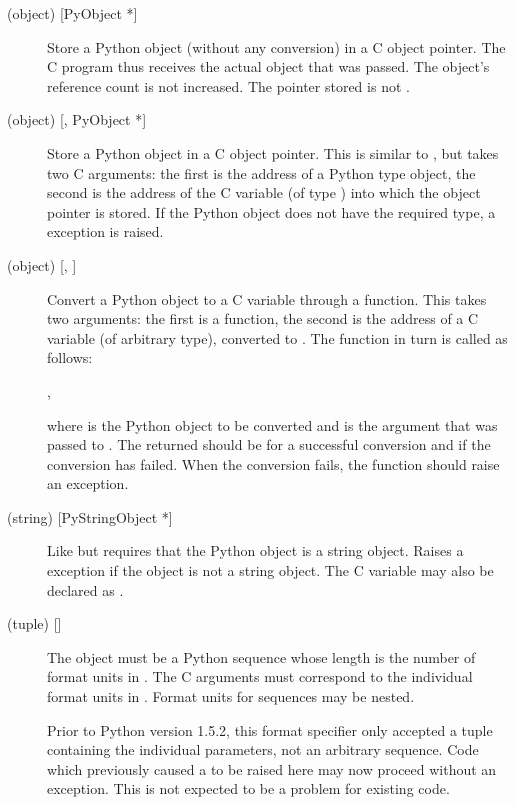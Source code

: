 \documentclass{manual}
\begin{document}
\begin{description}
\item[ (object) {[PyObject *]}]
Store a Python object (without any conversion) in a C object pointer.
The C program thus receives the actual object that was passed.  The
object's reference count is not increased.  The pointer stored is not
\NULL{}.

\item[ (object) {[, PyObject *]}]
Store a Python object in a C object pointer.  This is similar to
, but takes two C arguments: the first is the address of a
Python type object, the second is the address of the C variable (of
type ) into which the object pointer is stored.
If the Python object does not have the required type, a
 exception is raised.

\item[ (object) {[, ]}]
Convert a Python object to a C variable through a 
function.  This takes two arguments: the first is a function, the
second is the address of a C variable (of arbitrary type), converted
to .  The  function in turn is called as
follows:

\code{ = }\code{(}, \code{);}

where  is the Python object to be converted and
 is the  argument that was passed to
.  The returned  should be
 for a successful conversion and  if the conversion
has failed.  When the conversion fails, the  function
should raise an exception.

\item[ (string) {[PyStringObject *]}]
Like  but requires that the Python object is a string object.
Raises a  exception if the object is not a string
object.  The C variable may also be declared as .

\item[ (tuple) {[]}]
The object must be a Python sequence whose length is the number of
format units in .  The C arguments must correspond to the
individual format units in .  Format units for sequences
may be nested.

 Prior to Python version 1.5.2, this format specifier
only accepted a tuple containing the individual parameters, not an
arbitrary sequence.  Code which previously caused a
 to be raised here may now proceed without an
exception.  This is not expected to be a problem for existing code.

\end{description}
\end{document}
